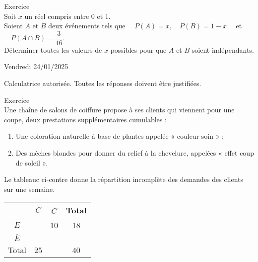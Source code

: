 \documentclass[a4paper,11pt,eval]{nsi}
\newcounter{exoNum}
\newcommand{\exo}[1]
{
	\addtocounter{exoNum}{1}
	{\titlefont\color{UGLiBlue}\Large Exercice\ \theexoNum\ \normalsize{#1}}\smallskip	
}
\begin{document}
\exo{}\\
Soit $x$ un réel compris entre 0 et 1.\\
Soient $A$ et $B$ deux événements tels que $\quad P(A)=x, \quad P(B)=1-x\quad$ et $\quad P(A \cap B)=\dfrac{3}{16}$.\\[.5em]
Déterminer toutes les valeurs de $x$ possibles pour que $A$ et $B$ soient indépendants.\\[1em]

\setcounter{exoNum}{0}
\newpage

\textcolor{UGLiBlue}{Vendredi 24/01/2025}\\
\maketitle
\begin{center}
	Calculatrice autorisée. Toutes les réponses doivent être justifiées.
\end{center}

\vspace{1cm}

\exo{}\\
Une chaîne de salons de coiffure propose à ses clients qui viennent pour une coupe, deux prestations supplémentaires cumulables :
\begin{enumerate}[label=\textbullet]
    \item Une coloration naturelle à base de plantes appelée « couleur-soin » ;
    \item Des mèches blondes pour donner du relief à la chevelure, appelées « effet coup de soleil ».
\end{enumerate}
Le tableauc ci-contre donne la répartition incomplète des demandes des clients sur une semaine.\\

{
    \begin{tabular}{|c|c|c|c|}
        \hline
        \rowcolor{UGLiOrange}& $C$ & $\overline{C}$ & Total\\
        \hline
        \cellcolor{UGLiOrange}$E$ & $ $ & 10 & 18\\
        \hline
        \cellcolor{UGLiOrange}$\overline{E}$ &\hspace*{.8cm} & \hspace*{.8cm}  & \hspace*{.8cm}\\
        \hline
        \cellcolor{UGLiOrange}Total & 25 &  & 40\\
        \hline
    \end{tabular}
}
\end{document}
